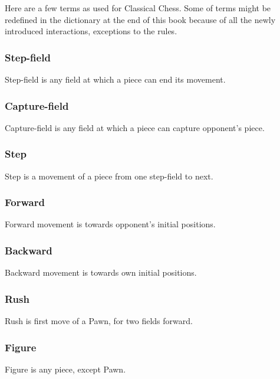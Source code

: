 Here are a few terms as used for Classical Chess. Some of terms might be redefined
in the dictionary at the end of this book because of all the newly introduced
interactions, exceptions to the rules.

\subsubsection*{Step-field}
\label{sec:Classical Chess/Variants/Terms/Step-field}
Step-field is any field at which a piece can end its movement.

\subsubsection*{Capture-field}
\label{sec:Classical Chess/Variants/Terms/Capture-field}
Capture-field is any field at which a piece can capture opponent's piece.

\subsubsection*{Step}
\label{sec:Classical Chess/Variants/Terms/Step}
Step is a movement of a piece from one step-field to next.

\subsubsection*{Forward}
\label{sec:Classical Chess/Variants/Terms/Forward}
Forward movement is towards opponent's initial positions.

\subsubsection*{Backward}
\label{sec:Classical Chess/Variants/Terms/Backward}
Backward movement is towards own initial positions.

\subsubsection*{Rush}
\label{sec:Classical Chess/Variants/Terms/Rush}
Rush is first move of a Pawn, for two fields forward.

\subsubsection*{Figure}
\label{sec:Classical Chess/Variants/Terms/Figure}
Figure is any piece, except Pawn.

\clearpage %

